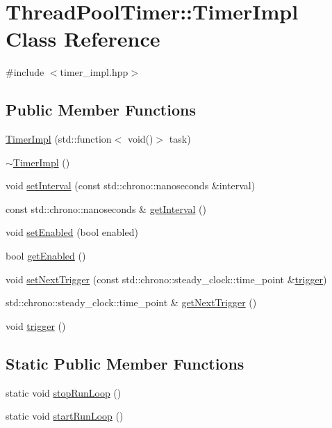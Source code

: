 \hypertarget{classThreadPoolTimer_1_1TimerImpl}{\section{Thread\-Pool\-Timer\-:\-:Timer\-Impl Class Reference}
\label{classThreadPoolTimer_1_1TimerImpl}
}


{\ttfamily \#include $<$timer\-\_\-impl.\-hpp$>$}

\subsection*{Public Member Functions}
\begin{DoxyCompactItemize}
\item 
\hyperlink{classThreadPoolTimer_1_1TimerImpl_adbb7de16348e9819dabc9319e4dfd4d0}{Timer\-Impl} (std\-::function$<$ void()$>$ task)
\item 
\hyperlink{classThreadPoolTimer_1_1TimerImpl_a97e1cf4b5bc2dd00c723b646384cd496}{$\sim$\-Timer\-Impl} ()
\item 
void \hyperlink{classThreadPoolTimer_1_1TimerImpl_a50873e7385216f0adb1e188281e25d93}{set\-Interval} (const std\-::chrono\-::nanoseconds \&interval)
\item 
const std\-::chrono\-::nanoseconds \& \hyperlink{classThreadPoolTimer_1_1TimerImpl_a5d2786dbaa14891acd5330b61c1a4bda}{get\-Interval} ()
\item 
void \hyperlink{classThreadPoolTimer_1_1TimerImpl_ab1be2145856231b15f1abc156ee1c508}{set\-Enabled} (bool enabled)
\item 
bool \hyperlink{classThreadPoolTimer_1_1TimerImpl_a588fd97294a1eb941670b49d6829947e}{get\-Enabled} ()
\item 
void \hyperlink{classThreadPoolTimer_1_1TimerImpl_a82e3056f281fe397ee7e297a573f97f6}{set\-Next\-Trigger} (const std\-::chrono\-::steady\-\_\-clock\-::time\-\_\-point \&\hyperlink{classThreadPoolTimer_1_1TimerImpl_ac89984aaaad00020982dc23205672aa5}{trigger})
\item 
std\-::chrono\-::steady\-\_\-clock\-::time\-\_\-point \& \hyperlink{classThreadPoolTimer_1_1TimerImpl_ad3a5a4a2fabfd54b069f5f30c65f2fea}{get\-Next\-Trigger} ()
\item 
void \hyperlink{classThreadPoolTimer_1_1TimerImpl_ac89984aaaad00020982dc23205672aa5}{trigger} ()
\end{DoxyCompactItemize}
\subsection*{Static Public Member Functions}
\begin{DoxyCompactItemize}
\item 
static void \hyperlink{classThreadPoolTimer_1_1TimerImpl_afc1e2e4b54e377e665fa04c6273e599d}{stop\-Run\-Loop} ()
\item 
static void \hyperlink{classThreadPoolTimer_1_1TimerImpl_a593b3028fedb0b0d135313148232f3cc}{start\-Run\-Loop} ()
\end{DoxyCompactItemize}


